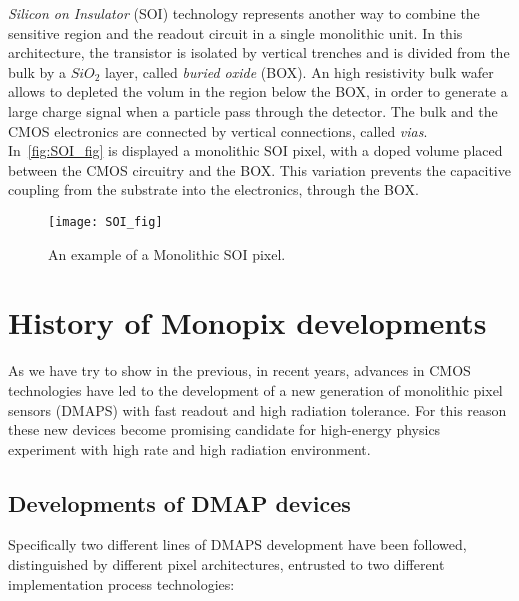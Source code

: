 \textit{Silicon on Insulator} (SOI) technology represents another way to combine the sensitive region and the readout circuit in a single monolithic unit. In this architecture, the transistor is isolated by vertical trenches and is divided from the bulk by a $SiO_{2}$ layer, called \emph{buried oxide} (BOX).
An high resistivity bulk wafer allows to depleted the volum in the region below the BOX, in order to generate a large charge signal when a particle pass through the detector. The bulk and the CMOS electronics are connected by vertical connections, called \textit{vias}. \\
In~\autoref{fig:SOI_fig} is displayed a monolithic SOI pixel, with a doped volume placed between the CMOS circuitry and the BOX. This variation prevents the capacitive coupling from the substrate into the electronics, through the BOX.

\begin{figure}[h!]
\centering
\texttt{[image: SOI\_fig]}
\caption{An example of a Monolithic SOI pixel.}
\label{fig:SOI_fig}
\end{figure}


\section{History of Monopix developments}

As we have try to show in the previous, in recent years, advances in CMOS technologies have led to the development of a new generation of monolithic pixel sensors (DMAPS) with fast readout and high radiation tolerance. For this reason these new devices become promising candidate for high-energy physics experiment with high rate and high radiation environment.


\subsection{Developments of DMAP devices}

Specifically two different lines of DMAPS development have been followed, distinguished by different pixel architectures, entrusted to two different implementation process technologies:

